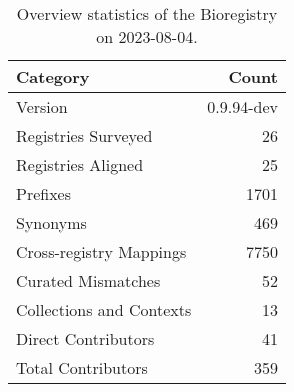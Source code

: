 \begin{table}
\caption{Overview statistics of the Bioregistry on 2023-08-04.}
\label{tab:bioregistry-summary}
\begin{tabular}{lr}
\toprule
Category & Count \\
\midrule
Version & 0.9.94-dev \\
Registries Surveyed & 26 \\
Registries Aligned & 25 \\
Prefixes & 1701 \\
Synonyms & 469 \\
Cross-registry Mappings & 7750 \\
Curated Mismatches & 52 \\
Collections and Contexts & 13 \\
Direct Contributors & 41 \\
Total Contributors & 359 \\
\bottomrule
\end{tabular}
\end{table}
